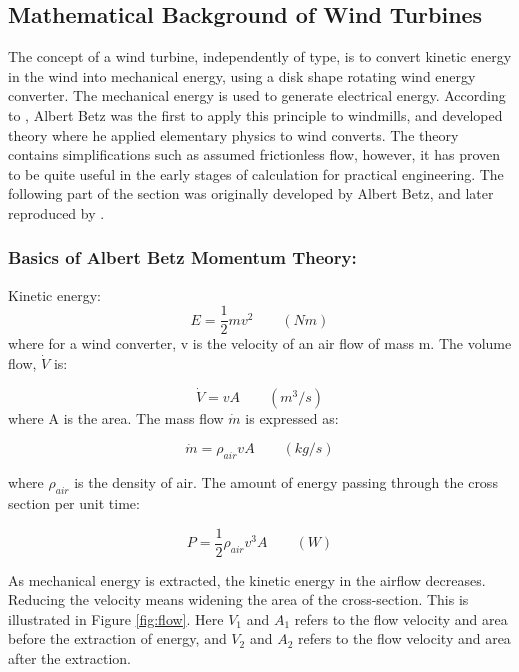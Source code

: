 \subsection{Mathematical Background of Wind Turbines}
The concept of a wind turbine, independently of type, is to convert kinetic energy in the wind into mechanical energy, using a disk shape rotating wind energy converter. The mechanical energy is used to generate electrical energy.  According to \cite{Hau2013},  Albert Betz was the first to apply this principle to windmills, and developed theory where he applied elementary physics to wind converts. The theory contains simplifications such as assumed frictionless flow, however, it has proven to be quite useful in the early stages of calculation for practical engineering. The following part of the section was originally developed by Albert Betz, and later reproduced by \cite{Hau2013}.

\subsubsection{Basics of Albert Betz Momentum Theory:}
\noindent Kinetic energy:
\begin{equation}
    E=\frac{1}{2} m v^2 \qquad (Nm)
\end{equation}
 where for a wind converter, v is the velocity of an air flow of mass m. The volume flow, $\dot V$ is:
 
 \begin{equation}
    \dot V= v A \qquad (m^3/s)
\end{equation}
where A is the area. The mass flow $\dot m$ is expressed as:

 \begin{equation}
    \dot m = \rho_{air} v A \qquad (kg/s)
\end{equation}

\noindent where $\rho_{air}$ is the density of air. The amount of energy passing through the cross section per unit time:

 \begin{equation}
    P = \frac{1}{2}\rho_{air} v^3 A \qquad (W)
\end{equation}

\noindent As mechanical energy is extracted, the kinetic energy in the airflow decreases. Reducing the velocity means widening the area of the cross-section. This is illustrated in Figure \ref{fig:flow}. Here $V_1$ and  $A_1$ refers to the flow velocity and area before the extraction of energy, and $V_2$ and $A_2$ refers to the flow velocity and area after the extraction.

